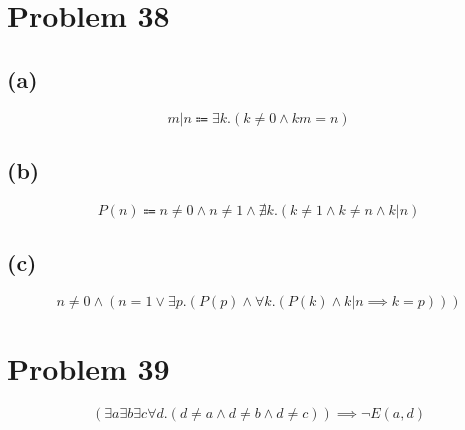 \documentclass{article}
\begin{document}
\pagebreak

\section{Problem 38}
\subsection{(a)}
\[
	m | n \Coloneqq \exists k.(k \ne 0 \land km = n)
\]
\subsection{(b)}
\[
	P(n) \Coloneqq n \ne 0 \land n \ne 1 \land	\nexists k.(k \ne 1 \land k \ne n \land k | n)
\]
\subsection{(c)}
\[
	n \ne 0 \land (n = 1 \lor \exists p.(P(p) \land \forall k.(P(k) \land k | n \implies k = p)))
\]

\pagebreak

\section{Problem 39}
\[
	(\exists a \exists b \exists c \forall d .(d \ne a \land d \ne b \land d \ne c)) \implies \neg E(a, d)
\]
\end{document}
